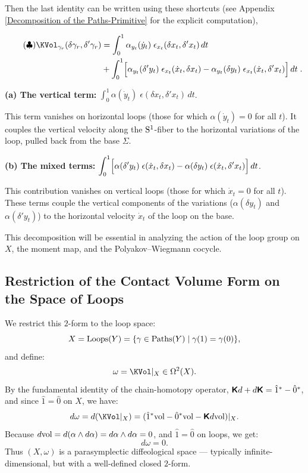 \documentclass[11pt,reqno,letterpaper,twoside]{amsart}
\begin{document}
  Then the last identity can be written using these shortcuts (see Appendix \ref{Decomposition of the Paths-Primitive} for the explicit computation),
  
  \begin{align*}\tag{$\clubsuit$}
    \KVol_{\gamma_r}(\delta\gamma_r, \delta'\gamma_r) &= \int_0^1 \alpha_{y_t}(\dot y_t) \; \epsilon_{x_t}(\delta x_t, \delta' x_t) \, dt \\
    &+ \int_0^1 \Bigl[ \alpha_{y_t}(\delta' y_t) \; \epsilon_{x_t}(\dot x_t, \delta x_t) - \alpha_{y_t}(\delta y_t) \; \epsilon_{x_t}(\dot x_t, \delta' x_t) \Bigr] \, dt \;.
  \end{align*}
  
  \textbf{(a) The vertical term:}
  $\displaystyle \int_0^1 \alpha(\dot y_t) \; \epsilon(\delta x_t, \delta' x_t) \, dt$.
  
  This term vanishes on horizontal loops
  (those for which $\alpha(\dot y_t) = 0$ for all $t$).
  It couples the vertical velocity along the $\mathrm{S}^1$-fiber
  to the horizontal variations of the loop,
  pulled back from the base $\Sigma$.
  
  \textbf{(b) The mixed terms:}
  $\displaystyle \int_0^1 \Bigl[
  \alpha(\delta' y_t) \; \epsilon(\dot x_t, \delta x_t)
  - \alpha(\delta y_t) \; \epsilon(\dot x_t, \delta' x_t)
  \Bigr] \, dt$.
  
  This contribution vanishes on vertical loops
  (those for which $\dot x_t = 0$ for all $t$).
  These terms couple the vertical components of the variations
  ($\alpha(\delta y_t)$ and $\alpha(\delta' y_t)$)
  to the horizontal velocity $\dot x_t$ of the loop on the base.
  
  This decomposition will be essential in analyzing
  the action of the loop group on $X$,
  the moment map,
  and the Polyakov--Wiegmann cocycle.
  
  \subsection{Restriction of the Contact Volume Form on the Space of Loops}
  
  We restrict this $2$-form to the loop space:
  \[
    X = \operatorname{Loops}(Y) = \{ \gamma \in \operatorname{Paths}(Y) \mid \gamma(1) = \gamma(0) \},
    \]
  and define:
  \[
    \omega = \KVol|_X \in \DForms^2(X).
    \]
  By the fundamental identity of the chain-homotopy operator,
  $\boldsymbol{\mathsf{K}} d + d\boldsymbol{\mathsf{K}} = \hat{1}^* - \hat{0}^*$,
  and since $\hat{1} = \hat{0}$ on $X$,
  we have:
  \[
    d\omega = d(\KVol|_X) = (\hat{1}^*\Vol - \hat{0}^*\Vol - \CHO d\Vol)|_X.
    \]
  Because $d\mathrm{vol} = d(\alpha \wedge d\alpha) = d\alpha \wedge d\alpha = 0$,
  and $\hat{1} = \hat{0}$ on loops,
  we get:
  \[
    d\omega = 0.
    \]
  Thus $(X, \omega)$ is a parasymplectic diffeological space ---
  typically infinite-dimensional,
  but with a well-defined closed $2$-form.
  
\end{document}
